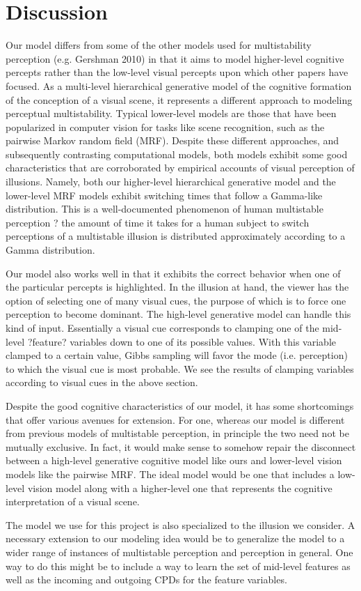 \documentclass{article} %
\begin{document}
\section{Discussion}
Our model differs from some of the other models used for multistability perception (e.g. Gershman 2010) in that it aims to model higher-level cognitive percepts rather than the low-level visual percepts upon which other papers have focused. As a multi-level hierarchical generative model of the cognitive formation of the conception of a visual scene, it represents a different approach to modeling perceptual multistability. Typical lower-level models are those that have been popularized in computer vision for tasks like scene recognition, such as the pairwise Markov random field (MRF). Despite these different approaches, and subsequently contrasting computational models, both models exhibit some good characteristics that are corroborated by empirical accounts of visual perception of illusions. Namely, both our higher-level hierarchical generative model and the lower-level MRF models exhibit switching times that follow a Gamma-like distribution. This is a well-documented phenomenon of human multistable perception ? the amount of time it takes for a human subject to switch perceptions of a multistable illusion is distributed approximately according to a Gamma distribution.

Our model also works well in that it exhibits the correct behavior when one of the particular percepts is highlighted. In the illusion at hand, the viewer has the option of selecting one of many visual cues, the purpose of which is to force one perception to become dominant. The high-level generative model can handle this kind of input. Essentially a visual cue corresponds to clamping one of the mid-level ?feature? variables down to one of its possible values. With this variable clamped to a certain value, Gibbs sampling will favor the mode (i.e. perception) to which the visual cue is most probable. We see the results of clamping variables according to visual cues in the above section.

Despite the good cognitive characteristics of our model, it has some shortcomings that offer various avenues for extension. For one, whereas our model is different from previous models of multistable perception, in principle the two need not be mutually exclusive. In fact, it would make sense to somehow repair the disconnect between a high-level generative cognitive model like ours and lower-level vision models like the pairwise MRF. The ideal model would be one that includes a low-level vision model along with a higher-level one that represents the cognitive interpretation of a visual scene.

The model we use for this project is also specialized to the illusion we consider. A necessary extension to our modeling idea would be to generalize the model to a wider range of instances of multistable perception and perception in general. One way to do this might be to include a way to learn the set of mid-level features as well as the incoming and outgoing CPDs for the feature variables.
\end{document}
